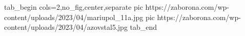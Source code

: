  
 
 
 
 


\ifcmt
  tab_begin cols=2,no_fig,center,separate
     pic https://zaborona.com/wp-content/uploads/2023/04/mariupol_11a.jpg
		 pic https://zaborona.com/wp-content/uploads/2023/04/azovstal5.jpg
  tab_end
\fi
